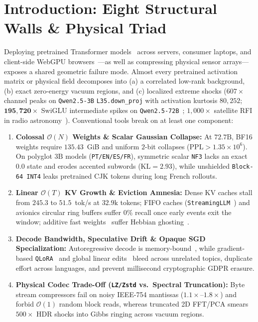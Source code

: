 \documentclass[10pt,twocolumn]{article}
\begin{document}
\section{Introduction: Eight Structural Walls \& Physical Triad}
Deploying pretrained Transformer models~\citep{vaswani2017attention} across servers, consumer laptops, and client-side WebGPU browsers~\citep{w3c2024webgpu}---as well as compressing physical sensor arrays---exposes a shared geometric failure mode. Almost every pretrained activation matrix or physical field decomposes into (a) a correlated low-rank background, (b) exact zero-energy vacuum regions, and (c) localized extreme shocks ($607\times$ channel peaks on \texttt{Qwen2.5-3B} \texttt{L35.down\_proj} with activation kurtosis $80{,}252$; $\mathbf{195{,}720\times}$ SwiGLU intermediate spikes on \texttt{Qwen2.5-72B}~\citep{dettmers2022llmint8,lin2024awq}; $1{,}000\times$ satellite RFI in radio astronomy~\citep{leshem2000multichannel}). Conventional tools break on at least one component:
\begin{enumerate}
    \item \textbf{Colossal $\mathcal{O}(N)$ Weights \& Scalar Gaussian Collapse:} At $72.7\text{B}$, BF16 weights require $135.43$~GiB and uniform $2$-bit collapses ($\mathrm{PPL} > 1.35 \times 10^6$). On polyglot $3\text{B}$ models (\texttt{PT/EN/ES/FR}), symmetric scalar \texttt{NF3} lacks an exact $0.0$ state and erodes accented subwords ($\mathrm{KL}=2.93$), while unshielded \texttt{Block-64 INT4} leaks pretrained CJK tokens during long French rollouts.
    \item \textbf{Linear $\mathcal{O}(T)$ KV Growth \& Eviction Amnesia:} Dense KV caches stall from $245.3$ to $51.5$~tok/s at $32.9\text{k}$ tokens; FIFO caches (\texttt{StreamingLLM}~\citep{xiao2024efficient}) and avionics circular ring buffers suffer $0\%$ recall once early events exit the window; additive fast weights~\citep{schmidhuber1992learning} suffer Hebbian ghosting~\citep{schlag2021linear,yang2024parallelizing}.
    \item \textbf{Decode Bandwidth, Speculative Drift \& Opaque SGD Specialization:} Autoregressive decode is memory-bound~\citep{leviathan2023fast}, while gradient-based \texttt{QLoRA}~\citep{dettmers2023qlora} and global linear edits~\citep{meng2022locating,fang2025alphaedit} bleed across unrelated topics, duplicate effort across languages, and prevent millisecond cryptographic GDPR erasure.
    \item \textbf{Physical Codec Trade-Off (\texttt{LZ/Zstd} vs.\ Spectral Truncation):} Byte stream compressors fail on noisy IEEE-754 mantissas ($1.1\times$--$1.8\times$) and forbid $\mathcal{O}(1)$ random block reads, whereas truncated 2D FFT/PCA smears $500\times$ HDR shocks into Gibbs ringing across vacuum regions.
\end{enumerate}
\end{document}
